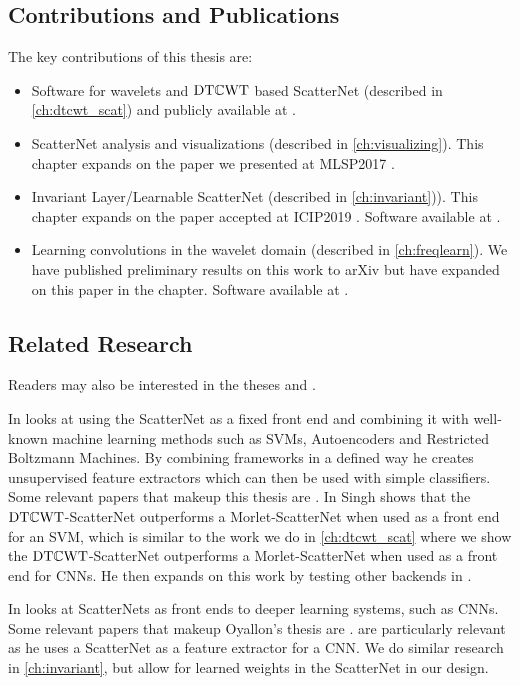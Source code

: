 \subsection{Contributions and Publications}
The key contributions of this thesis are:

\begin{itemize}
  \item Software for wavelets and $\mathrm{DT}\mathbb{C}\mathrm{WT}$ based ScatterNet (described in \autoref{ch:dtcwt_scat})
    and publicly available at \cite{cotter_pytorch_2018}.
  \item ScatterNet analysis and visualizations (described in
    \autoref{ch:visualizing}). This chapter expands on the paper we presented at MLSP2017
    \cite{cotter_visualizing_2017}.
  \item Invariant Layer/Learnable ScatterNet (described in \autoref{ch:invariant})). This chapter expands
    on the paper accepted at ICIP2019 \cite{cotter_learnable_2019}. Software
    available at \cite{cotter_learnable_2019-1}.
  \item Learning convolutions in the wavelet domain (described in
    \autoref{ch:freqlearn}). We have published preliminary results on this work
    to arXiv \cite{cotter_deep_2018} but have expanded on this paper in the
    chapter. Software available at \cite{cotter_dtcwt_2018}.
\end{itemize}

\subsection{Related Research}
Readers may also be interested in the theses \cite{singh_scatternet_2018} and
\cite{oyallon_analyzing_2017}.

In \cite{singh_scatternet_2018}
\citeauthor{singh_scatternet_2018} looks at using the ScatterNet as a fixed
front end and combining it with well-known machine learning methods such as
SVMs, Autoencoders and Restricted Boltzmann Machines. By combining frameworks in
a defined way he creates unsupervised feature extractors which can then be used
with simple classifiers. Some relevant papers that makeup this thesis are \cite{singh_multi-resolution_2016,
singh_scatternet_2017, singh_generative_2018}. In
\cite{singh_multi-resolution_2016} Singh shows
that the $\mathrm{DT}\mathbb{C}\mathrm{WT}$-ScatterNet outperforms a Morlet-ScatterNet when used as a front end for
an SVM, which is similar to the work we do in \autoref{ch:dtcwt_scat} where we
show the $\mathrm{DT}\mathbb{C}\mathrm{WT}$-ScatterNet outperforms a Morlet-ScatterNet when used as a
front end for CNNs. He then expands on this work by testing other backends in
\cite{singh_scatternet_2017, singh_generative_2018}.

In \cite{oyallon_analyzing_2017}
\citeauthor{oyallon_analyzing_2017} looks at ScatterNets as front ends to
deeper learning systems, such as CNNs. Some relevant papers that makeup Oyallon's thesis are
\cite{oyallon_deep_2015, oyallon_scaling_2017, oyallon_hybrid_2017}. \cite{oyallon_scaling_2017, oyallon_hybrid_2017}
are particularly relevant as he uses a ScatterNet as a feature extractor for a
CNN. We do similar research in \autoref{ch:invariant}, but allow for
learned weights in the ScatterNet in our design.
